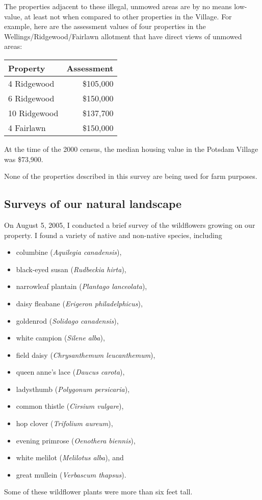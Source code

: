 \documentclass[12pt]{article}
\begin{document}
The properties adjacent to these illegal, unmowed areas are by no means low-value, at least not when compared to other properties in the Village.
For example, here are the assessment values of four properties in the Wellings/Ridgewood/Fairlawn allotment that have direct views of unmowed areas:
\begin{center}
\begin{tabular}{|l|r|}
\hline
{\bf Property} & {\bf Assessment}\\
\hline
\hline
4 Ridgewood & \$105,000\\
\hline
6 Ridgewood & \$150,000\\
\hline
10 Ridgewood & \$137,700\\
\hline
4 Fairlawn & \$150,000\\
\hline
\end{tabular}
\end{center}
At the time of the 2000 census, the median housing value in the Potsdam Village was \$73,900.

None of the properties described in this survey are being used for farm purposes.


\subsection{Surveys of our natural landscape}
On August 5, 2005, I conducted a brief survey of the wildflowers growing on our property.
I found a variety of native and non-native species, including 
\begin{itemize}
\item columbine ({\em Aquilegia canadensis}), 
\item black-eyed susan ({\em Rudbeckia hirta}),
\item narrowleaf plantain ({\em Plantago lanceolata}),
\item daisy fleabane ({\em Erigeron philadelphicus}),
\item goldenrod ({\em Solidago canadensis}),
\item white campion ({\em Silene alba}),
\item field daisy ({\em Chrysanthemum leucanthemum}),
\item queen anne's lace ({\em Daucus carota}),
\item ladysthumb ({\em Polygonum persicaria}),
\item common thistle ({\em Cirsium vulgare}),
\item hop clover ({\em Trifolium aureum}),
\item evening primrose ({\em Oenothera biennis}),
\item white melilot ({\em Melilotus alba}), and
\item great mullein ({\em Verbascum thapsus}).   
\end{itemize}  
Some of these wildflower plants were more than six feet tall.
\end{document}
